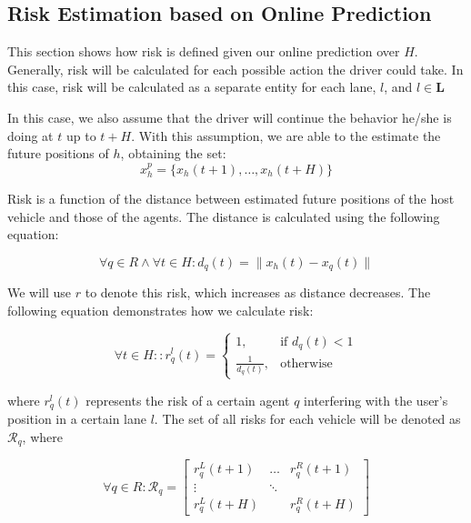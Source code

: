 \documentclass[letterpaper, 10 pt, conference]{ieeeconf}  %
\begin{document}
\subsection{Risk Estimation based on Online Prediction}
This section shows how risk is defined given our online prediction over $H$. Generally, risk will be calculated for each possible action the driver could take. In this case, risk will be calculated as a separate entity for each lane, $l$, and $l\in\mathbf{L}$

In this case, we also assume that the driver will continue the behavior he/she is doing at $t$ up to $t+H$. With this assumption, we are able to the estimate the future positions of $h$, obtaining the set:
\begin{equation}
    x_h^p = \{x_h(t+1),\ldots,x_h(t+H)\}
\end{equation}

Risk is a function of the distance between estimated future positions of the host vehicle and those of the agents. The distance is calculated using the following equation:

\begin{equation}
    \forall q \in R \land \forall t\in H : d_q(t) = \lVert x_h(t)-x_q(t)\rVert
\end{equation}

We will use $r$ to denote this risk, which increases as distance decreases. The following equation demonstrates how we calculate risk:

\begin{equation}
\forall{t}\in H::
    r_{q}^{l}(t) =
    \begin{cases}
    1,                      & \text{if } d_{q}(t) < 1 \\
    \frac{1}{d_{q}(t)},  & \text{otherwise} 
    \end{cases}
\end{equation}

where $r_{q}^{l}(t)$ represents the risk of a certain agent $q$ interfering with the user's position in a certain lane $l$. The set of all risks for each vehicle will be denoted as $\mathcal{R}_q$, where

\begin{equation}
    \forall{q} \in R: \mathcal{R}_q =
                    \begin{bmatrix}
                        r_q^L(t+1) & \dots & r_q^R(t+1) \\
                        \vdots & \ddots & \\
                        r_q^L(t+H) &    & r_q^R(t+H)
                    \end{bmatrix}
\end{equation}
\end{document}
